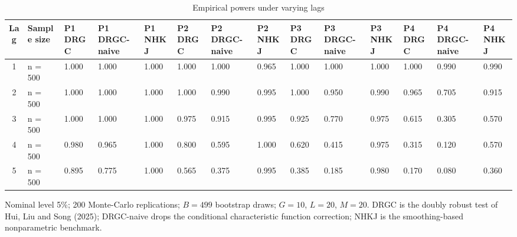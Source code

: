 \begin{table}[htbp]
\centering
\caption{Empirical powers under varying lags}
\label{tab:power}
\small
\begin{tabular}{clllllllllllll}
\toprule
Lag & Sample size & P1 DRGC & P1 DRGC-naive & P1 NHKJ & P2 DRGC & P2 DRGC-naive & P2 NHKJ & P3 DRGC & P3 DRGC-naive & P3 NHKJ & P4 DRGC & P4 DRGC-naive & P4 NHKJ \\
\midrule
1 & n = 500 & 1.000 & 1.000 & 1.000 & 1.000 & 1.000 & 0.965 & 1.000 & 1.000 & 1.000 & 1.000 & 0.990 & 0.990 \\
2 & n = 500 & 1.000 & 1.000 & 1.000 & 1.000 & 0.990 & 0.995 & 1.000 & 0.950 & 0.990 & 0.965 & 0.705 & 0.915 \\
3 & n = 500 & 1.000 & 1.000 & 1.000 & 0.975 & 0.915 & 0.995 & 0.925 & 0.770 & 0.975 & 0.615 & 0.305 & 0.570 \\
4 & n = 500 & 0.980 & 0.965 & 1.000 & 0.800 & 0.595 & 1.000 & 0.620 & 0.415 & 0.975 & 0.315 & 0.120 & 0.570 \\
5 & n = 500 & 0.895 & 0.775 & 1.000 & 0.565 & 0.375 & 0.995 & 0.385 & 0.185 & 0.980 & 0.170 & 0.080 & 0.360 \\
\bottomrule
\end{tabular}

\begin{minipage}{\linewidth}\footnotesize
Nominal level 5\%; 200 Monte-Carlo replications; $B=499$ bootstrap draws; $G=10$, $L=20$, $M=20$.  DRGC is the doubly robust test of Hui, Liu and Song (2025); DRGC-naive drops the conditional characteristic function correction; NHKJ is the smoothing-based nonparametric benchmark.
\end{minipage}
\end{table}
